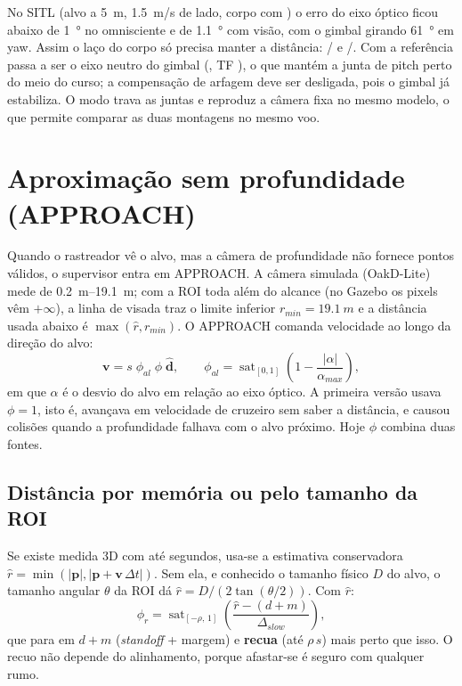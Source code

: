 No SITL (alvo a \SI{5}{m}, \SI{1.5}{m/s} de lado, corpo com ) o erro do eixo
óptico ficou abaixo de \SI{1}{\degree} no omnisciente e de \SI{1.1}{\degree} com visão, com o
gimbal girando \SI{61}{\degree} em yaw. Assim o laço do corpo só precisa manter a distância:
/ e /. Com
 a referência passa a ser o eixo neutro do gimbal (,
TF ), o que mantém a junta de pitch perto do meio do curso; a compensação de
arfagem deve ser desligada, pois o gimbal já estabiliza. O modo  trava as juntas e
reproduz a câmera fixa no mesmo modelo, o que permite comparar as duas montagens no mesmo voo.

\section{Aproximação sem profundidade (APPROACH)}
\label{sec:approach}
Quando o rastreador vê o alvo, mas a câmera de profundidade não fornece pontos válidos,
o supervisor entra em APPROACH. A câmera simulada (OakD-Lite) mede de \SIrange{0.2}{19.1}{m}; com
a ROI toda além do alcance (no Gazebo os pixels vêm $+\infty$), a linha de visada traz o limite
inferior $r_{min}=\SI{19.1}{m}$ e a distância usada abaixo é $\max(\hat r, r_{min})$. O APPROACH comanda velocidade ao longo da direção do alvo:
\begin{equation}
  \mathbf v = s\;\phi_{al}\;\phi\;\hat{\mathbf d},\qquad
  \phi_{al}=\operatorname{sat}_{[0,1]}\!\left(1-\frac{|\alpha|}{\alpha_{max}}\right),
\end{equation}
em que $\alpha$ é o desvio do alvo em relação ao eixo óptico. A primeira versão usava
$\phi=1$, isto é, avançava em velocidade de cruzeiro sem saber a distância, e causou
colisões quando a profundidade falhava com o alvo próximo. Hoje $\phi$ combina duas fontes.

\subsection{Distância por memória ou pelo tamanho da ROI}
Se existe medida 3D com até  segundos, usa-se a estimativa
conservadora $\hat r=\min(|\mathbf p|,|\mathbf p+\mathbf v\,\Delta t|)$. Sem ela, e
conhecido o tamanho físico $D$ do alvo, o tamanho angular $\theta$ da ROI dá
$\hat r=D/(2\tan(\theta/2))$. Com $\hat r$:
\begin{equation}
  \phi_r=\operatorname{sat}_{[-\rho,\,1]}\!\left(\frac{\hat r-(d+m)}{\Delta_{slow}}\right),
\end{equation}
que para em $d+m$ (\emph{standoff} + margem) e \textbf{recua} (até $\rho\,s$) mais perto que
isso. O recuo não depende do alinhamento, porque afastar-se é seguro com qualquer rumo.

